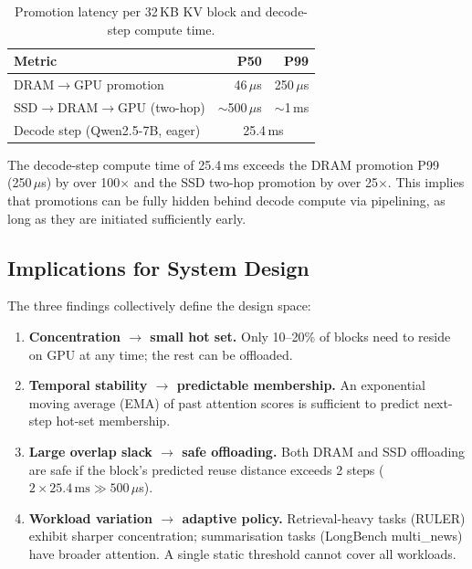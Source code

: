 \documentclass[acmsmall,nonacm,screen]{acmart}
\begin{document}
\begin{table}[t]
\centering
\caption{Promotion latency per 32\,KB KV block and decode-step compute time.}
\label{tab:latency}
\begin{tabular}{lrr}
\toprule
\textbf{Metric} & \textbf{P50} & \textbf{P99} \\
\midrule
DRAM$\to$GPU promotion    & 46\,$\mu$s   & 250\,$\mu$s  \\
SSD$\to$DRAM$\to$GPU (two-hop) & ${\sim}$500\,$\mu$s & ${\sim}$1\,ms \\
Decode step (Qwen2.5-7B, eager) & \multicolumn{2}{c}{25.4\,ms} \\
\bottomrule
\end{tabular}
\end{table}

The decode-step compute time of 25.4\,ms exceeds the DRAM promotion P99
(250\,$\mu$s) by over 100$\times$ and the SSD two-hop promotion by over
25$\times$.  This implies that promotions can be fully hidden behind decode
compute via pipelining, as long as they are initiated sufficiently early.

\subsection{Implications for System Design}\label{sec:meas:implications}

The three findings collectively define the design space:

\begin{enumerate}
  \item \textbf{Concentration $\to$ small hot set.} Only 10--20\% of blocks
    need to reside on GPU at any time; the rest can be offloaded.

  \item \textbf{Temporal stability $\to$ predictable membership.}  An
    exponential moving average (EMA) of past attention scores is
    sufficient to predict next-step hot-set membership.

  \item \textbf{Large overlap slack $\to$ safe offloading.}  Both DRAM and
    SSD offloading are safe if the block's predicted reuse distance exceeds
    2 steps ($2 \times 25.4\,\text{ms} \gg 500\,\mu$s).

  \item \textbf{Workload variation $\to$ adaptive policy.}  Retrieval-heavy
    tasks (RULER) exhibit sharper concentration; summarisation tasks
    (LongBench multi\_news) have broader attention.  A single static
    threshold cannot cover all workloads.
\end{enumerate}
\end{document}
